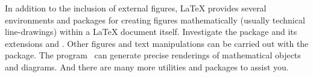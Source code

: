 In addition to the inclusion of external figures, \LaTeX{} provides
several environments and packages for creating figures mathematically
(usually technical line-drawings) within a \LaTeX{} document itself.
Investigate the  package and its extensions 
and .  Other figures and text manipulations can be carried
out with the  package.  The program \MP\ can generate
precise renderings of mathematical objects and diagrams.  And there
are many more utilities and packages to assist you.


